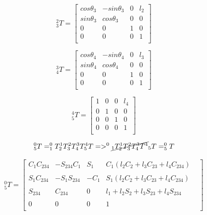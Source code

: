\documentclass[transmag]{IEEEtran}
\begin{document}
\begin{eqfloat}
\begin{equation}
^2_3T =
\begin{bmatrix}
cos\theta_3 & -sin\theta_3 & 0      & l_2 \\
sin\theta_3 & cos\theta_3  & 0      & 0   \\
0           & 0            & 1      & 0   \\
0           & 0            & 0      & 1   \\
\end{bmatrix}
\end{equation}



\begin{equation}
^3_4T =
\begin{bmatrix}
cos\theta_4 & -sin\theta_4 & 0      & l_3 \\
sin\theta_4 & cos\theta_4  & 0      & 0   \\
0           & 0            & 1      & 0   \\
0           & 0            & 0      & 1   \\
\end{bmatrix}
\end{equation}



\begin{equation}
^4_5T =
\begin{bmatrix}
1 & 0 & 0 & l_4  \\
0 & 1 & 0 & 0   \\
0 & 0 & 1 & 0   \\
0 & 0 & 0 & 1   \\
\end{bmatrix}
\end{equation}

\begin{equation}
^0_5T = ^0_1T  ^1_2T  ^2_3T  ^3_4T  ^4_5T => ^0 \cancel{_1T  ^1_2T  ^2_3T  ^3_4T  ^4} _5T = ^0_5T
\label{1-5}
\end{equation}




\begin{equation}
^0_5T =
\begin{bmatrix}
C_1C_{234}
& 
-S_{234}C_1
& 
S_1
& 
C_1(l_2 C_2 + l_3 C_{23} + l_4 C_{234}) \\
&&&&
\\
S_1 C_{234}     
& 
-S_1 S_{234} 
& 
-C_1
& 
 S_1 (l_2 C_2 + l_3 C_{23} + l_4 C_{234})
\\
&&&&
\\
S_{234}
&
C_{234}
&
0
&
l_1 + l_2 S_2 + l_3 S_{23} + l_4 S_{234} 
\\
&&&&
\\
0           & 0            & 0      & 1   \\
\end{bmatrix}
\label{Forward Kinematics}
\end{equation}

\end{eqfloat}
\end{document}
